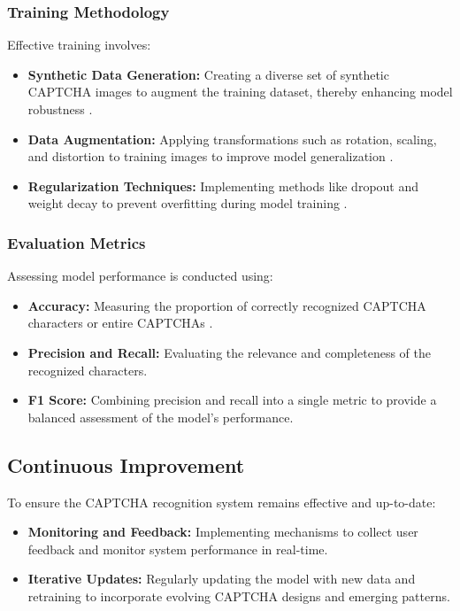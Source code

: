 \documentclass[sigconf]{acmart}
\begin{document}
\subsubsection{Training Methodology}

Effective training involves:

\begin{itemize} \item \textbf{Synthetic Data Generation:} Creating a diverse set of synthetic CAPTCHA images to augment the training dataset, thereby enhancing model robustness \cite{turn0academia20}. \item \textbf{Data Augmentation:} Applying transformations such as rotation, scaling, and distortion to training images to improve model generalization \cite{turn0search13}. \item \textbf{Regularization Techniques:} Implementing methods like dropout and weight decay to prevent overfitting during model training \cite{turn0search16}. \end{itemize}

\subsubsection{Evaluation Metrics}

Assessing model performance is conducted using:

\begin{itemize} \item \textbf{Accuracy:} Measuring the proportion of correctly recognized CAPTCHA characters or entire CAPTCHAs \cite{turn0search16}. \item \textbf{Precision and Recall:} Evaluating the relevance and completeness of the recognized characters. \item \textbf{F1 Score:} Combining precision and recall into a single metric to provide a balanced assessment of the model's performance. \end{itemize}

\subsection{Continuous Improvement}

To ensure the CAPTCHA recognition system remains effective and up-to-date:

\begin{itemize} \item \textbf{Monitoring and Feedback:} Implementing mechanisms to collect user feedback and monitor system performance in real-time. \item \textbf{Iterative Updates:} Regularly updating the model with new data and retraining to incorporate evolving CAPTCHA designs and emerging patterns. \end{itemize}
\end{document}
